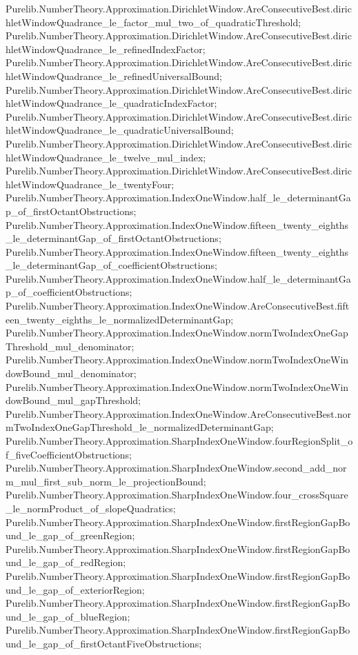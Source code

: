 \documentclass[11pt]{article}
\begin{document}
{Purelib.NumberTheory.Approximation.DirichletWindow.AreConsecutiveBest.dirichletWindowQuadrance_le_factor_mul_two_of_quadraticThreshold;
Purelib.NumberTheory.Approximation.DirichletWindow.AreConsecutiveBest.dirichletWindowQuadrance_le_refinedIndexFactor;
Purelib.NumberTheory.Approximation.DirichletWindow.AreConsecutiveBest.dirichletWindowQuadrance_le_refinedUniversalBound;
Purelib.NumberTheory.Approximation.DirichletWindow.AreConsecutiveBest.dirichletWindowQuadrance_le_quadraticIndexFactor;
Purelib.NumberTheory.Approximation.DirichletWindow.AreConsecutiveBest.dirichletWindowQuadrance_le_quadraticUniversalBound;
Purelib.NumberTheory.Approximation.DirichletWindow.AreConsecutiveBest.dirichletWindowQuadrance_le_twelve_mul_index;
Purelib.NumberTheory.Approximation.DirichletWindow.AreConsecutiveBest.dirichletWindowQuadrance_le_twentyFour;
Purelib.NumberTheory.Approximation.IndexOneWindow.half_le_determinantGap_of_firstOctantObstructions;
Purelib.NumberTheory.Approximation.IndexOneWindow.fifteen_twenty_eighths_le_determinantGap_of_firstOctantObstructions;
Purelib.NumberTheory.Approximation.IndexOneWindow.fifteen_twenty_eighths_le_determinantGap_of_coefficientObstructions;
Purelib.NumberTheory.Approximation.IndexOneWindow.half_le_determinantGap_of_coefficientObstructions;
Purelib.NumberTheory.Approximation.IndexOneWindow.AreConsecutiveBest.fifteen_twenty_eighths_le_normalizedDeterminantGap;
Purelib.NumberTheory.Approximation.IndexOneWindow.normTwoIndexOneGapThreshold_mul_denominator;
Purelib.NumberTheory.Approximation.IndexOneWindow.normTwoIndexOneWindowBound_mul_denominator;
Purelib.NumberTheory.Approximation.IndexOneWindow.normTwoIndexOneWindowBound_mul_gapThreshold;
Purelib.NumberTheory.Approximation.IndexOneWindow.AreConsecutiveBest.normTwoIndexOneGapThreshold_le_normalizedDeterminantGap;
Purelib.NumberTheory.Approximation.SharpIndexOneWindow.fourRegionSplit_of_fiveCoefficientObstructions;
Purelib.NumberTheory.Approximation.SharpIndexOneWindow.second_add_norm_mul_first_sub_norm_le_projectionBound;
Purelib.NumberTheory.Approximation.SharpIndexOneWindow.four_crossSquare_le_normProduct_of_slopeQuadratics;
Purelib.NumberTheory.Approximation.SharpIndexOneWindow.firstRegionGapBound_le_gap_of_greenRegion;
Purelib.NumberTheory.Approximation.SharpIndexOneWindow.firstRegionGapBound_le_gap_of_redRegion;
Purelib.NumberTheory.Approximation.SharpIndexOneWindow.firstRegionGapBound_le_gap_of_exteriorRegion;
Purelib.NumberTheory.Approximation.SharpIndexOneWindow.firstRegionGapBound_le_gap_of_blueRegion;
Purelib.NumberTheory.Approximation.SharpIndexOneWindow.firstRegionGapBound_le_gap_of_firstOctantFiveObstructions;
}
\end{document}
